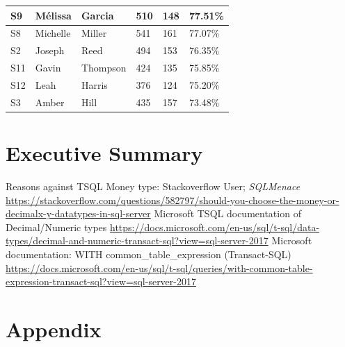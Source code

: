 \documentclass{article}
\begin{document}
\begin{table}[H]
\begin{tabular}{|l|l|l|l|l|l|}
                S9      & Mélissa        & Garcia       & 510              & 148            & 77.51\%               \\ \hline
                S8      & Michelle       & Miller       & 541              & 161            & 77.07\%               \\ \hline
                S2      & Joseph         & Reed         & 494              & 153            & 76.35\%               \\ \hline
                S11     & Gavin          & Thompson     & 424              & 135            & 75.85\%               \\ \hline
                S12     & Leah           & Harris       & 376              & 124            & 75.20\%               \\ \hline
                S3      & Amber          & Hill         & 435              & 157            & 73.48\%               \\ \hline
                \end{tabular}
            \end{table}
    \newpage
    \section{Executive Summary}

    \newpage
    \begin{thebibliography}{9}
        \raggedright
            Reasons against TSQL Money type: Stackoverflow User; \textit{SQLMenace}
            \url{https://stackoverflow.com/questions/582797/should-you-choose-the-money-or-decimalx-y-datatypes-in-sql-server}
            Microsoft TSQL documentation of Decimal/Numeric types
            \url{https://docs.microsoft.com/en-us/sql/t-sql/data-types/decimal-and-numeric-transact-sql?view=sql-server-2017}
        Microsoft documentation: WITH common\_table\_expression (Transact-SQL)
            \url{https://docs.microsoft.com/en-us/sql/t-sql/queries/with-common-table-expression-transact-sql?view=sql-server-2017}
    \end{thebibliography}

    \newpage
    \section{Appendix}
    \label{sec:Appendix}
\end{document}
